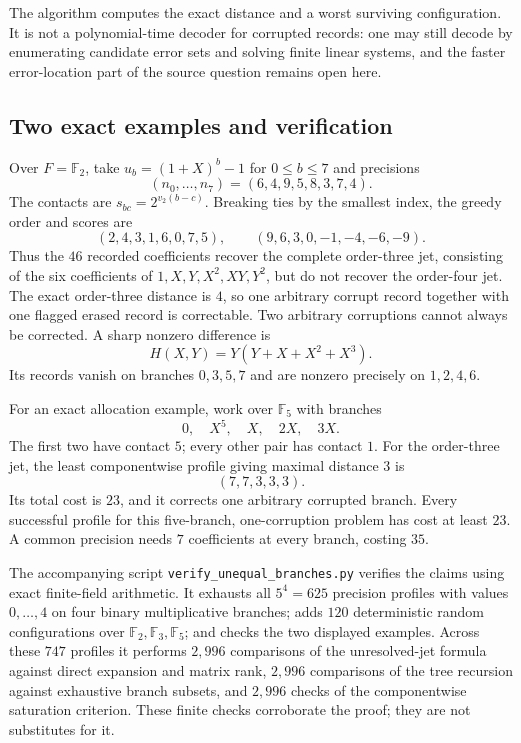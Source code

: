 The algorithm computes the exact distance and a worst surviving
configuration.  It is not a polynomial-time decoder for corrupted records:
one may still decode by enumerating candidate error sets and solving finite
linear systems, and the faster error-location part of the source question
remains open here.

\subsection{Two exact examples and verification}

Over $F=\mathbb F_2$, take $u_b=(1+X)^b-1$ for $0\le b\le7$ and precisions
\[
 (n_0,\ldots,n_7)=(6,4,9,5,8,3,7,4).
\]
The contacts are $s_{bc}=2^{v_2(b-c)}$.  Breaking ties by the smallest
index, the greedy order and scores are
\[
 (2,4,3,1,6,0,7,5),\qquad(9,6,3,0,-1,-4,-6,-9).
\]
Thus the $46$ recorded coefficients recover the complete order-three jet,
consisting of the six coefficients of $1,X,Y,X^2,XY,Y^2$, but do not
recover the order-four jet.  The exact order-three distance is $4$, so
one arbitrary corrupt record together with one flagged erased record
is correctable.  Two arbitrary corruptions cannot always be corrected.
A sharp nonzero difference is
\[
 H(X,Y)=Y(Y+X+X^2+X^3).
\]
Its records vanish on branches $0,3,5,7$ and are nonzero precisely on
$1,2,4,6$.

For an exact allocation example, work over $\mathbb F_5$ with branches
\[
 0,\quad X^5,\quad X,\quad2X,\quad3X.
\]
The first two have contact $5$; every other pair has contact $1$.
For the order-three jet, the least componentwise profile giving maximal
distance $3$ is
\[
 (7,7,3,3,3).
\]
Its total cost is $23$, and it corrects one arbitrary corrupted branch.
Every successful profile for this five-branch, one-corruption problem has
cost at least $23$.  A common precision needs $7$ coefficients at every
branch, costing $35$.

The accompanying script \texttt{verify\_unequal\_branches.py} verifies the
claims using exact finite-field arithmetic.  It exhausts all $5^4=625$
precision profiles with values $0,\ldots,4$ on four binary multiplicative
branches; adds $120$ deterministic random configurations over
$\mathbb F_2,\mathbb F_3,\mathbb F_5$; and checks the two displayed examples.
Across these $747$ profiles it performs $2{,}996$ comparisons of the
unresolved-jet formula against direct expansion and matrix rank,
$2{,}996$ comparisons of the tree recursion against exhaustive branch
subsets, and $2{,}996$ checks of the componentwise saturation criterion.
These finite checks corroborate the proof; they are not substitutes for it.

